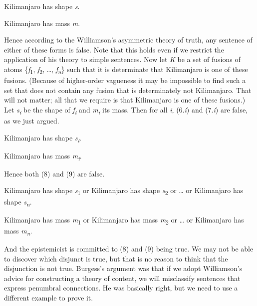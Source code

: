 \documentclass[
  11pt,
  letterpaper,
  DIV=11,
  numbers=noendperiod,
  twoside]{scrartcl}
\providecommand{\tightlist}{%
  \setlength{\itemsep}{0pt}\setlength{\parskip}{0pt}}
\begin{document}
\begin{description}
\tightlist
\item[(6)]
Kilimanjaro has shape \emph{s}.
\item[(7)]
Kilimanjaro has mass \emph{m}.
\end{description}

Hence according to the Williamson's asymmetric theory of truth, any
sentence of either of these forms is false. Note that this holds even if
we restrict the application of his theory to simple sentences. Now let
\emph{K} be a set of fusions of atoms \{\emph{f}\textsubscript{1},
\emph{f}\textsubscript{2}, \ldots, \emph{f\textsubscript{n}}\} such that
it is determinate that Kilimanjaro is one of these fusions. (Because of
higher-order vagueness it may be impossible to find such a set that does
not contain any fusion that is determinately not Kilimanjaro. That will
not matter; all that we require is that Kilimanjaro is one of these
fusions.) Let \emph{s\textsubscript{i}} be the shape of
\emph{f\textsubscript{i}} and \emph{m\textsubscript{i}} its mass. Then
for all \emph{i}, (6.\emph{i}) and (7.\emph{i}) are false, as we just
argued.

\begin{description}
\tightlist
\item[(6.\emph{i})]
Kilimanjaro has shape \emph{s\textsubscript{i}}.
\item[(7.\emph{i})]
Kilimanjaro has mass \emph{m\textsubscript{i}}.
\end{description}

Hence both (8) and (9) are false.

\begin{description}
\tightlist
\item[(8)]
Kilimanjaro has shape \emph{s}\textsubscript{1} or Kilimanjaro has shape
\emph{s}\textsubscript{2} or \ldots{} or Kilimanjaro has shape
\emph{s\textsubscript{n}}.
\item[(9)]
Kilimanjaro has mass \emph{m}\textsubscript{1} or Kilimanjaro has mass
\emph{m}\textsubscript{2} or \ldots{} or Kilimanjaro has mass
\emph{m\textsubscript{n}}.
\end{description}

And the epistemicist is committed to (8) and (9) being true. We may not
be able to discover which disjunct is true, but that is no reason to
think that the disjunction is not true. Burgess's argument was that if
we adopt Williamson's advice for constructing a theory of content, we
will misclassify sentences that express penumbral connections. He was
basically right, but we need to use a different example to prove it.
\end{document}
